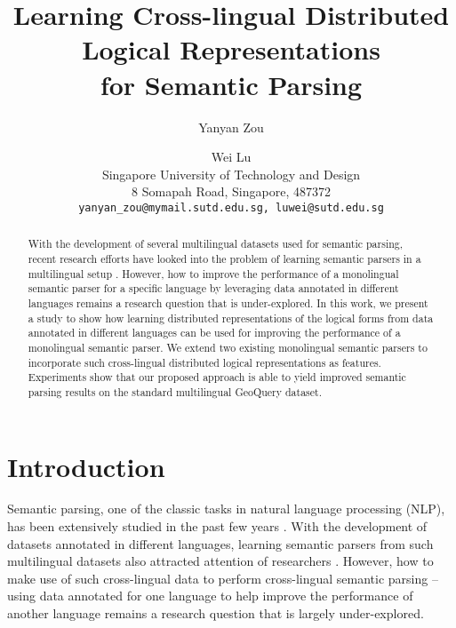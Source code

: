 \documentclass[11pt,a4paper]{article}
\title{Learning Cross-lingual Distributed Logical Representations \\for Semantic Parsing}
\author{%
	Yanyan Zou \and Wei Lu\\
  Singapore University of Technology and Design \\
  8 Somapah Road, Singapore, 487372 \\
  {\tt yanyan\_zou@mymail.sutd.edu.sg, luwei@sutd.edu.sg} \\
}
\date{}
\begin{document}
\maketitle
\begin{abstract}


With the development of several multilingual datasets used for semantic parsing, recent research efforts have looked into the problem of learning semantic parsers in a multilingual setup \cite{duong2017multilingual,P17-2007}.
However, how to improve the performance of a monolingual semantic parser for a specific language by leveraging data annotated in different languages remains a research question that is under-explored.
In this work, we present a study to show how learning distributed representations of the logical forms from data annotated in different languages can be used for improving the performance of a monolingual semantic parser.
We extend two existing monolingual semantic parsers to incorporate such cross-lingual distributed logical representations as features.
Experiments show that our proposed approach is able to yield improved semantic parsing results on the standard multilingual GeoQuery dataset.


\end{abstract}

\section{Introduction}
Semantic parsing, one of the classic tasks in natural language processing (NLP), has been extensively studied in the past few years \cite{zettlemoyerlearning,WongYW:06,Wong:07,liang11dcs,kwiatkowski2011lexical:11,artzi2015broad:15}.
With the development of datasets annotated in different languages, learning semantic parsers from such multilingual datasets also attracted attention of researchers \cite{P17-2007}.
However, how to make use of such cross-lingual data to perform cross-lingual semantic parsing -- using data annotated for one language to help improve the performance of another language remains a research question that is largely under-explored.
\end{document}
